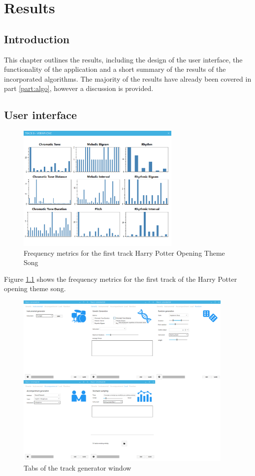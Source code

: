 

\chapter{Results}

\section{Introduction}
This chapter outlines the results, including the design of the user interface, the functionality of the application and a short summary of the results of the incorporated algorithms.
The majority of the results have already been covered in part \ref{part:algo}, however a discussion is provided.

\section{User interface}

\begin{figure}
\centerline{\includegraphics[width=300px]{../images/res_ui_metrics_harry_t0.png}}
\caption{Frequency metrics for the first track Harry Potter Opening Theme Song}
\label{ims:metricsharryt0}
\end{figure}

Figure \ref{ims:metricsharryt0} shows the frequency metrics for the first track of the Harry Potter opening theme song.

\begin{figure}
\centerline{\includegraphics[width=400px]{../images/ui_trackgen_alltabs.png}}
\caption{Tabs of the track generator window}
\label{ims:uitrackgenalltabs}
\end{figure}

